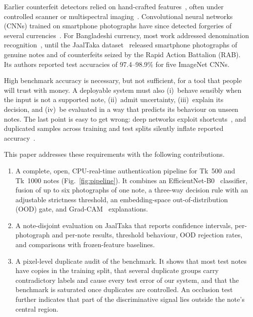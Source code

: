 \documentclass[journal]{IEEEtran}
\begin{document}
Earlier counterfeit detectors relied on hand-crafted features~\cite{yeh2011,
berenguel2016,uddin2016}, often under controlled scanner or multispectral
imaging~\cite{baek2018}. Convolutional neural networks (CNNs) trained on smartphone
photographs have since detected forgeries of several currencies~\cite{pham2020,pham2022}.
For Bangladeshi currency, most work addressed denomination
recognition~\cite{jahangir2007,linkon2020}, until the JaalTaka
dataset~\cite{piyas2025jaaltaka} released smartphone photographs of genuine notes and of
counterfeits seized by the Rapid Action Battalion (RAB). Its authors reported test
accuracies of 97.4--98.9\% for five ImageNet CNNs.

High benchmark accuracy is necessary, but not sufficient, for a tool that people will
trust with money. A deployable system must also (i)~behave sensibly when the input is
not a supported note, (ii)~admit uncertainty, (iii)~explain its decision, and (iv)~be
evaluated in a way that predicts its behaviour on unseen notes. The last point is easy
to get wrong: deep networks exploit shortcuts~\cite{geirhos2020shortcut}, and duplicated
samples across training and test splits silently inflate reported
accuracy~\cite{kapoor2023leakage}.

This paper addresses these requirements with the following contributions.
\begin{enumerate}
\item A complete, open, CPU-real-time authentication pipeline for Tk~500 and Tk~1000
notes (Fig.~\ref{fig:pipeline}). It combines an EfficientNet-B0~\cite{tan2019efficientnet}
classifier, fusion of up to six photographs of one note, a three-way decision rule with
an adjustable strictness threshold, an embedding-space out-of-distribution (OOD) gate,
and Grad-CAM~\cite{selvaraju2017gradcam} explanations.
\item A note-disjoint evaluation on JaalTaka that reports confidence intervals,
per-photograph and per-note results, threshold behaviour, OOD rejection rates, and
comparisons with frozen-feature baselines.
\item A pixel-level duplicate audit of the benchmark. It shows that most test notes have
copies in the training split, that several duplicate groups carry contradictory labels
and cause every test error of our system, and that the benchmark is saturated once
duplicates are controlled. An occlusion test further indicates that part of the
discriminative signal lies outside the note's central region.
\end{enumerate}
\end{document}
